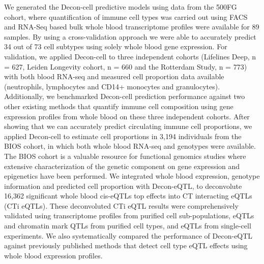 We generated the Decon-cell predictive models using data from the  500FG cohort\cite{neteaUnderstandingHumanImmune2016}, where quantification of immune cell types was carried out using FACS\cite{aguirre-gamboaDifferentialEffectsEnvironmental2016} and RNA-Seq based bulk whole blood transcriptome profiles were available for 89 samples\cite{bakkerIntegrationMultiomicsData2018}. By using a cross-validation approach we were able to accurately predict 34 out of 73 cell subtypes using solely whole blood gene expression. For validation, we applied Decon-cell to three independent cohorts (Lifelines Deep\cite{tigchelaarCohortProfileLifeLines2015}, n = 627, Leiden Longevity cohort\cite{deelenGenomewideAssociationMetaanalysis2014}, n = 660 and the Rotterdam Study\cite{hofmanRotterdamStudy20162015}, n = 773) with both blood RNA-seq and measured cell proportion data available (neutrophils, lymphocytes and CD14+ monocytes and granulocytes). Additionally, we benchmarked Decon-cell prediction performance against two other existing methods that quantify immune cell composition using gene expression profiles from whole blood on these three independent cohorts. After showing that we can accurately predict circulating immune cell proportions, we applied Decon-cell to estimate cell proportions in 3,194 individuals from the BIOS cohort\cite{tigchelaarCohortProfileLifeLines2015,greevenbroekCrosssectionalAssociationInsulin2011,schoenmakerEvidenceGeneticEnrichment2006,willemsenNetherlandsTwinRegister2010}, in which both whole blood RNA-seq and genotypes were available. The BIOS cohort is a valuable resource for functional genomics studies where extensive characterization of the genetic component on gene expression\cite{zhernakovaIdentificationContextdependentExpression2017} and epigenetics\cite{bonderDiseaseVariantsAlter2017} have been performed. We integrated whole blood expression, genotype information and predicted cell proportion with Decon-eQTL, to deconvolute 16,362 significant whole blood cis-eQTLs top effects into CT interacting eQTLs (CTi eQTLs). These deconvoluted CTi eQTL results were comprehensively validated using transcriptome profiles from purified cell sub-populations\cite{adamsBLUEPRINTDecodeEpigenetic2012}, eQTLs and chromatin mark QTLs from purified cell types\cite{chenGeneticDriversEpigenetic2016}, and eQTLs from single-cell experiments\cite{wijstSinglecellRNASequencing2018}. We also systematically compared the performance of Decon-eQTL against previously published methods\cite{westraCellSpecificEQTL2015,zhernakovaIdentificationContextdependentExpression2017} that detect cell type eQTL effects using whole blood expression profiles. 

